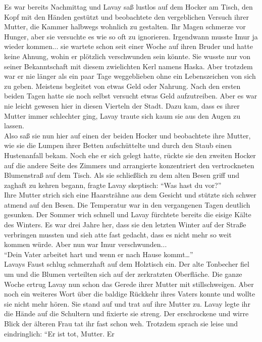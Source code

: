 Es war bereits Nachmittag und Lavay saß lustlos auf dem Hocker am Tisch, den Kopf mit den Händen 
gestützt und beobachtete den vergeblichen Versuch ihrer Mutter, die Kammer halbwegs wohnlich zu 
gestalten. Ihr Magen schmerze vor Hunger, aber sie versuchte es wie so oft zu ignorieren. 
Irgendwann musste Imur ja wieder kommen... sie wartete schon seit einer Woche auf ihren Bruder 
und hatte keine Ahnung, wohin er plötzlich verschwunden sein könnte. Sie wusste nur von seiner 
Bekanntschaft mit diesem zwielichten Kerl namens Haska. Aber trotzdem war er nie länger als ein 
paar Tage weggeblieben ohne ein Lebenszeichen von sich zu geben. Meistens begleitet von etwas 
Geld oder Nahrung. Nach den ersten beiden Tagen hatte sie noch selbst versucht etwas Geld 
aufzutreiben. Aber es war nie leicht gewesen hier in diesen Vierteln der Stadt. Dazu kam, dass 
es ihrer Mutter immer schlechter ging, Lavay traute sich kaum sie aus den Augen zu lassen.\\
Also saß sie nun hier auf einen der beiden Hocker und beobachtete ihre Mutter, wie sie die 
Lumpen ihrer Betten aufschüttelte und durch den Staub einen Hustenanfall bekam. Noch ehe er sich 
gelegt hatte, rückte sie den zweiten Hocker auf die andere Seite des Zimmers und arrangierte 
konzentriert den vertrockneten Blumenstraß auf dem Tisch. Als sie schließlich zu dem alten Besen 
griff und zaghaft zu kehren begann, fragte Lavay skeptisch: ``Was hast du vor?''\\
Ihre Mutter strich sich eine Haarsträhne aus dem Gesicht und stützte sich schwer atmend auf den 
Besen. Die Temperatur war in den vergangenen Tagen deutlich gesunken. Der Sommer wich schnell und 
Lavay fürchtete bereits die eisige Kälte des Winters. Es war drei Jahre her, dass sie den letzten 
Winter auf der Straße verbringen mussten und sieh atte fast gedacht, dass es nicht mehr so weit 
kommen würde. Aber nun war Imur verschwunden...\\
``Dein Vater arbeitet hart und wenn er nach Hause kommt…''\\
Lavays Faust schlug schmerzhaft auf dem Holztisch ein. Der alte Tonbecher fiel um und die Blumen 
verteilten sich auf der zerkratzten Oberfläche. Die ganze Woche ertrug Lavay nun schon das Gerede 
ihrer Mutter mit stillschweigen. Aber noch ein weiteres Wort über die baldige Rückkehr ihres Vaters 
konnte und wollte sie nicht mehr hören. Sie stand auf und trat auf ihre Mutter zu. Lavay legte ihr 
die Hände auf die Schultern und fixierte sie streng. Der erschrockene und wirre Blick der älteren 
Frau tat ihr fast schon weh. Trotzdem sprach sie leise und eindringlich: ``Er ist tot, Mutter. Er 
